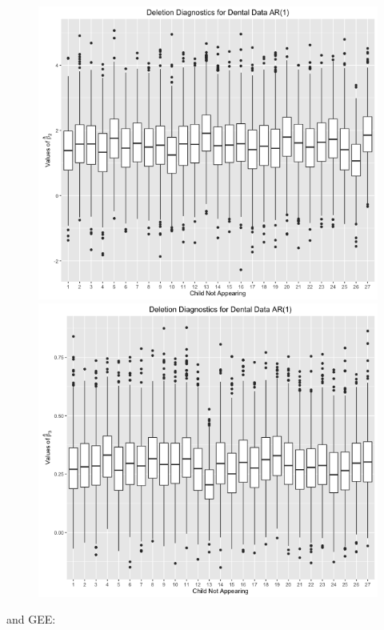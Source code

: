 \documentclass[11pt]{article}
\begin{document}
\begin{enumerate}
\begin{figure}[H]
			\includegraphics[scale=0.4]{RplotDDAR1Beta2.png}
			\includegraphics[scale=0.4]{RplotDDAR1Beta3.png}
		\end{figure}
		and GEE:
		\begin{figure}[H]

\end{figure}
\end{enumerate}
\end{document}
